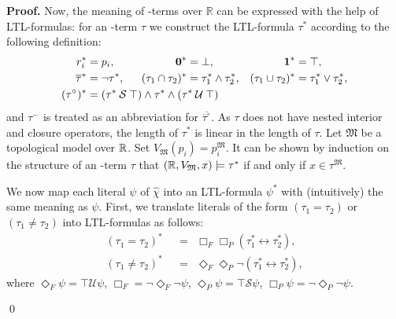 \documentclass{LMCS}
\renewenvironment{proof}{\par\noindent\textbf{Proof.}}{\mbox{}\qed\par\medskip}
\theoremstyle{plain}
\newcommand{\ti}[2][]{#2^{\circ_{#1}}}
\newcommand{\tc}[2][]{#2^{-_{#1}}}
\newcommand{\compl}[2][]{\overline{#2}}
\newcommand{\since}{\mathbin{\mathcal{S}}}
\newcommand{\until}{\mathbin{\mathcal{U}}}
\begin{document}
\begin{proof}
Now, the meaning of \SFU-terms over $\mathbb R$ can be expressed with the
help of LTL-formulas: for an \SFU-term $\tau$ we construct the
LTL-formula $\tau^\ast$ according to the following definition:
\begin{align*}
r_i^{\ast} & = p_i, & \zero^\ast & = \bot, &  \one^\ast & =  \top,\\
\compl{\tau}^{\ast} & = \neg \tau^{\ast}, &
(\tau_{1} \cap \tau_{2})^\ast & = \tau_1^\ast\land\tau_2^\ast, & (\tau_{1} \cup \tau_{2})^\ast & = \tau_1^\ast\lor\tau_2^\ast, \\
(\ti{\tau})^\ast & = (\tau^{\ast} \since \top) \land \tau^\ast \land (\tau^{\ast} \until \top)\hspace*{-8em}\end{align*}
and $\tc{\tau}$ is treated as an abbreviation for $\compl{\ti{\compl{\tau}}}$. As $\tau$ does not have nested interior and closure operators, the length of $\tau^\ast$ is linear in the length of $\tau$. Let $\mathfrak{M}$ be a topological model over $\mathbb{R}$. Set $V_\mathfrak{M}(p_i) = p_i^\mathfrak{M}$. It can be shown by induction on the structure of an \SFU-term $\tau$ that $(\mathbb{R},V_\mathfrak{M},x)\models \tau^\ast$ if and only if $x\in\tau^\mathfrak{M}$.

We now map each literal $\psi$ of $\hat{\chi}$ into an LTL-formula
$\psi^*$ with (intuitively) the same meaning as $\psi$.  First, we
translate literals of the form $(\tau_1 = \tau_2)$ or
$(\tau_1\ne\tau_2)$ into LTL-formulas as follows:
\begin{align*}
(\tau_1 = \tau_2)^{\ast} & \ \ = \ \ \Box_F\Box_P  (\tau_1^{\ast} \leftrightarrow \tau_2^\ast),\\
(\tau_1 \ne \tau_2)^{\ast} & \ \ = \ \ \Diamond_F\Diamond_P \neg(\tau_1^{\ast} \leftrightarrow \tau_2^\ast),\end{align*}
where $\Diamond_{F}\psi = \top \until \psi$, $\Box_F = \neg\Diamond_F\neg\psi$,
$\Diamond_{P}\psi = \top \since \psi$, $\Box_P\psi= \neg\Diamond_P\neg\psi$.



\end{proof}
\end{document}
